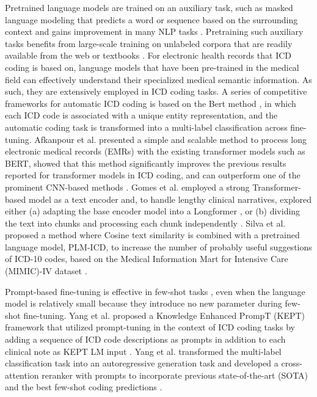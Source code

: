 Pretrained language models are trained on an auxiliary task, such as masked language modeling that predicts a word or sequence based on the surrounding context and gains improvement in many NLP tasks \cite{qiu2020pre}. Pretraining such auxiliary tasks benefits from large-scale training on unlabeled corpora that are readily available from the web or textbooks \cite{ji2021does}. For electronic health records that ICD coding is based on, language models that have been pre-trained in the medical field can effectively understand their specialized medical semantic information. As such, they are extensively employed in ICD coding tasks. A series of competitive frameworks for automatic ICD coding is based on the Bert method \cite{ji2021,zhang2020,pascual2021}, in which each ICD code is associated with a unique entity representation, and the automatic coding task is transformed into a multi-label classification across fine-tuning. Afkanpour et al. presented a simple and scalable method to process long electronic medical records (EMRs) with the existing transformer models such as BERT, showed that this method significantly improves the previous results reported for transformer models in ICD coding, and can outperform one of the prominent CNN-based methods \cite{afkanpour2022bert}. Gomes et al. employed a strong Transformer-based model as a text encoder and, to handle lengthy clinical narratives, explored either (a) adapting the base encoder model into a Longformer \cite{beltagy2020longformer}, or (b) dividing the text into chunks and processing each chunk independently \cite{gomes2024accurate}. Silva et al. proposed a method where Cosine text similarity is combined with a pretrained language model, PLM-ICD, to increase the number of probably useful suggestions of ICD-10 codes, based on the Medical Information Mart for Intensive Care (MIMIC)-IV dataset \cite{silva2024aiding}. 

Prompt-based fine-tuning is effective in few-shot tasks \cite{scao2021many,gao2020making}, even when the language model is relatively small \cite{schick2020s} because they introduce no new parameter during few-shot fine-tuning. Yang et al. proposed a Knowledge Enhanced PrompT (KEPT) framework that utilized prompt-tuning in the context of ICD coding tasks by adding a sequence of ICD code descriptions as prompts in addition to each clinical note as KEPT LM input \cite{yang2022knowledge}. Yang et al. transformed the multi-label classification task into an autoregressive generation task and developed a cross-attention reranker with prompts to incorporate previous state-of-the-art (SOTA) and the best few-shot coding predictions \cite{yang2023multi}. 
 
